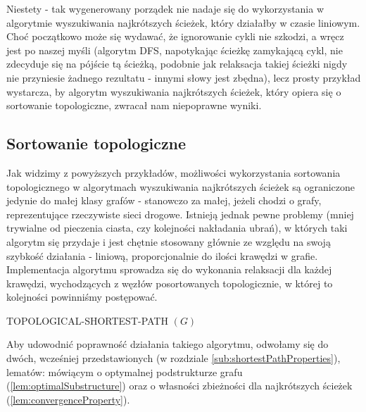 Niestety - tak wygenerowany porządek nie nadaje się do wykorzystania w algorytmie wyszukiwania najkrótszych ścieżek, który działałby w czasie liniowym. Choć początkowo może się wydawać, że ignorowanie cykli nie szkodzi, a wręcz jest po naszej myśli (algorytm \textsf{DFS}, napotykając ścieżkę zamykającą cykl, nie zdecyduje się na pójście tą ścieżką, podobnie jak relaksacja takiej ścieżki nigdy nie przyniesie żadnego rezultatu - innymi słowy jest zbędna), lecz prosty przykład wystarcza, by algorytm wyszukiwania najkrótszych ścieżek, który opiera się o sortowanie topologiczne, zwracał nam niepoprawne wyniki.

\subsection{Sortowanie topologiczne}

Jak widzimy z powyższych przykładów, możliwości wykorzystania sortowania topologicznego w algorytmach wyszukiwania najkrótszych ścieżek są ograniczone jedynie do małej klasy grafów - stanowczo za małej, jeżeli chodzi o grafy, reprezentujące rzeczywiste sieci drogowe. Istnieją jednak pewne problemy (mniej trywialne od pieczenia ciasta, czy kolejności nakładania ubrań), w których taki algorytm się przydaje i jest chętnie stosowany głównie ze względu na swoją szybkość działania - liniową, proporcjonalnie do ilości krawędzi w grafie. Implementacja algorytmu sprowadza się do wykonania relaksacji dla każdej krawędzi, wychodzących z węzłów posortowanych topologicznie, w której to kolejności powinniśmy postępować.

\begin{algorithm}[!htbp]
\DontPrintSemicolon
{}
\caption{ TOPOLOGICAL-SHORTEST-PATH $\left( G \right)$\label{alg:topologicalShorestPath}}
\end{algorithm}

Aby udowodnić poprawność działania takiego algorytmu, odwołamy się do dwóch, wcześniej przedstawionych (w rozdziale \ref{sub:shortestPathProperties}), lematów: mówiącym o optymalnej podstrukturze grafu (\ref{lem:optimalSubstructure}) oraz o własności zbieżności dla najkrótszych ścieżek (\ref{lem:convergenceProperty}).

